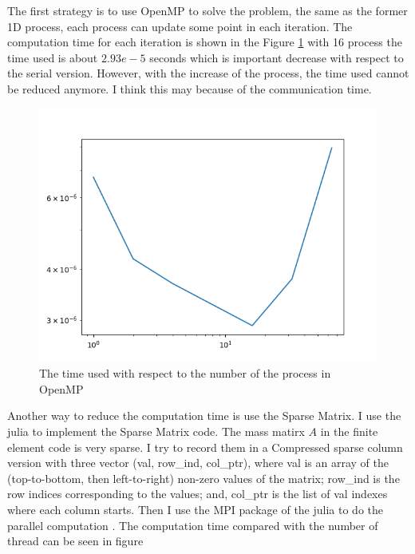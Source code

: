 \documentclass[11pt]{article}
\begin{document}
The first strategy  is to use OpenMP to solve the problem, the same as the former 1D process, each process can update some point in each iteration. The computation time for each iteration is shown in the Figure \ref{fig:2D openMP time} with  16 process the time used is about $2.93e-5$ seconds which is important decrease with respect to the serial version. However, with the increase of the process, the time used cannot be reduced anymore. I think this may because of the communication time.
\begin{figure}
    \centering
    \includegraphics[width=0.8\linewidth]{CPP_code/2D_problem/cpp_code/openmp/sphere/time_OpenMP_2D.png}
    \caption{The time used with respect to the number of the process in OpenMP}
    \label{fig:2D openMP time}
\end{figure}

Another way to reduce the computation time is use the Sparse Matrix. I use the julia to implement the Sparse Matrix code. The mass matirx $A$ in the finite element code is very sparse. I try to record them in a Compressed sparse column version with three vector (val, row\_ind, col\_ptr), where val is an array of the (top-to-bottom, then left-to-right) non-zero values of the matrix; row\_ind is the row indices corresponding to the values; and, col\_ptr is the list of val indexes where each column starts. Then I use the MPI package of the julia to do the parallel computation \cite{Byrne2021}. The computation time compared with the number of thread can be seen in figure
\end{document}
